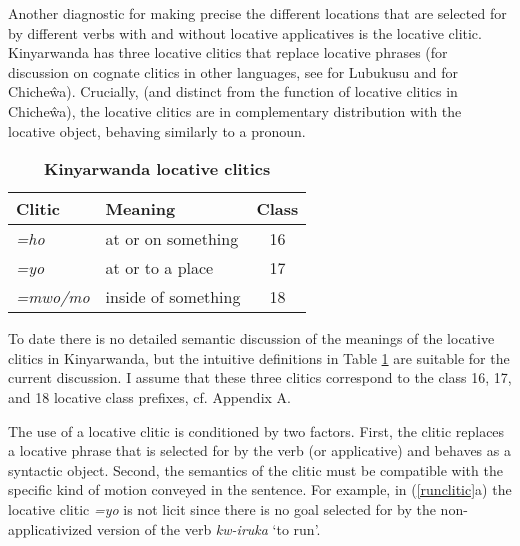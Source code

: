 \documentclass[output=paper]{langsci/langscibook}
\begin{document}
Another diagnostic for making precise the different locations that are selected for by different verbs with and without locative applicatives is the locative clitic. Kinyarwanda has three locative clitics that  replace locative phrases (for discussion on cognate clitics in other languages, see \citet{diercks:2011} for Lubukusu and \citet{simango:2012} for Chiche\^wa). 	Crucially, (and distinct from the function of locative clitics in Chiche\^wa), the locative clitics are in complementary distribution with the locative object, behaving similarly to a pronoun. 
%
\begin{table}[ht]
	\begin{center}	
 \caption{\textbf{Kinyarwanda locative clitics}}
	\begin{tabular}[t]{llc}\\\hline
		Clitic			& Meaning				& Class \\\hline
			 \emph{=ho}  & at or on something	& 16 \\
			
		 \emph{=yo} 	&  at or to a place 		& 17 \\

		 \emph{=mwo/mo}  &  inside of something & 18\\
	
	\hline
	 \end{tabular}
\label{tab:clitic} 
	 		 \end{center}
\end{table}
%
To date there is no detailed semantic discussion of the meanings of the locative clitics in Kinyarwanda, but the intuitive definitions in Table \ref{tab:clitic} are suitable for the current discussion. I assume that these three clitics correspond to the class 16, 17, and 18 locative class prefixes, cf. Appendix A.  

The use of a locative clitic is conditioned by two factors. First, the clitic replaces a locative phrase that is selected for by the verb (or applicative) and behaves as a syntactic object. Second, the semantics of the clitic must be compatible with the specific kind of motion conveyed in the sentence.  For example, in (\ref{runclitic}a) the locative clitic \emph{=yo} is not licit since there is no {\sc goal}  selected for by the non-applicativized version of the verb \emph{kw-iruka} `to run'. 
 
\end{document}
